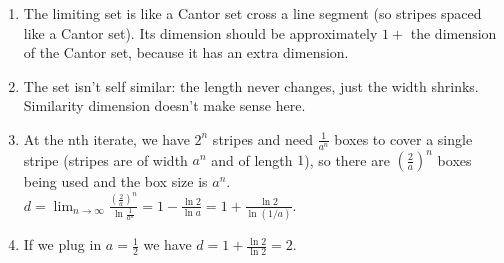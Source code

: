 \documentclass[12pt,letterpaper,noanswers]{exam}
\begin{document}
\begin{enumerate}
\begin{enumerate}
 \item The limiting set is like a Cantor set cross a line segment (so stripes spaced like a Cantor set).  Its dimension should be approximately $1+$ the dimension of the Cantor set, because it has an extra dimension.  \item The set isn't self similar: the length never changes, just the width shrinks. Similarity dimension doesn't make sense here.
 \item At the nth iterate, we have $2^n$ stripes and need $\frac{1}{a^n}$ boxes to cover a single stripe (stripes are of width $a^n$ and of length $1$), so there
 are $\left(\frac{2}{a}\right)^n$ boxes being used and the box size is $a^n$.  
 $d = \lim_{n\rightarrow\infty} \frac{\left(\frac{2}{a}\right)^n}{\ln \frac{1}{a^n}} = 1- \frac{\ln 2}{\ln a} = 1+ \frac{\ln 2}{\ln (1/a)}.$
 \item If we plug in $a = \frac{1}{2}$ we have $d = 1+ \frac{\ln 2}{\ln 2} = 2$.
 \end{enumerate}
\end{enumerate}
\end{document}

